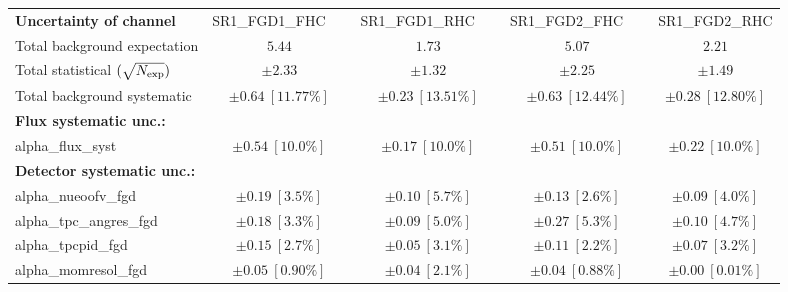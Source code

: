
\begin{table}
\begin{center}
\setlength{\tabcolsep}{0.0pc}
\begin{tabular*}{\textwidth}{@{\extracolsep{\fill}}lcccc}
\noalign{\smallskip}\hline\noalign{\smallskip}
{\bf Uncertainty of channel}                                    & {\small SR1\_FGD1\_FHC}~~~           & {\small SR1\_FGD1\_RHC}~~~            & {\small SR1\_FGD2\_FHC}~~~            & {\small SR1\_FGD2\_RHC}            \\
\noalign{\smallskip}\hline\noalign{\smallskip}
Total background expectation             &  $5.44$        &  $1.73$        &  $5.07$        &  $2.21$       \\
\noalign{\smallskip}\hline\noalign{\smallskip}
Total statistical $(\sqrt{N_{\rm exp}})$              & $\pm 2.33$        & $\pm 1.32$        & $\pm 2.25$        & $\pm 1.49$       \\
Total background systematic               & $\pm 0.64\ [11.77\%] $        & $\pm 0.23\ [13.51\%] $        & $\pm 0.63\ [12.44\%] $        & $\pm 0.28\ [12.80\%] $             \\
\noalign{\smallskip}\hline\noalign{\smallskip}
\noalign{\smallskip}\hline\noalign{\smallskip}
{\bf Flux systematic unc.:} \\
alpha\_flux\_syst         & $\pm 0.54\ [10.0\%] $          & $\pm 0.17\ [10.0\%] $          & $\pm 0.51\ [10.0\%] $          & $\pm 0.22\ [10.0\%] $       \\
{\bf Detector systematic unc.:} \\
alpha\_nueoofv\_fgd         & $\pm 0.19\ [3.5\%] $          & $\pm 0.10\ [5.7\%] $          & $\pm 0.13\ [2.6\%] $          & $\pm 0.09\ [4.0\%] $       \\
alpha\_tpc\_angres\_fgd         & $\pm 0.18\ [3.3\%] $          & $\pm 0.09\ [5.0\%] $          & $\pm 0.27\ [5.3\%] $          & $\pm 0.10\ [4.7\%] $       \\
alpha\_tpcpid\_fgd         & $\pm 0.15\ [2.7\%] $          & $\pm 0.05\ [3.1\%] $          & $\pm 0.11\ [2.2\%] $          & $\pm 0.07\ [3.2\%] $       \\
alpha\_momresol\_fgd         & $\pm 0.05\ [0.90\%] $          & $\pm 0.04\ [2.1\%] $          & $\pm 0.04\ [0.88\%] $          & $\pm 0.00\ [0.01\%] $       \\

\end{tabular*}
\end{center}
\end{table}
